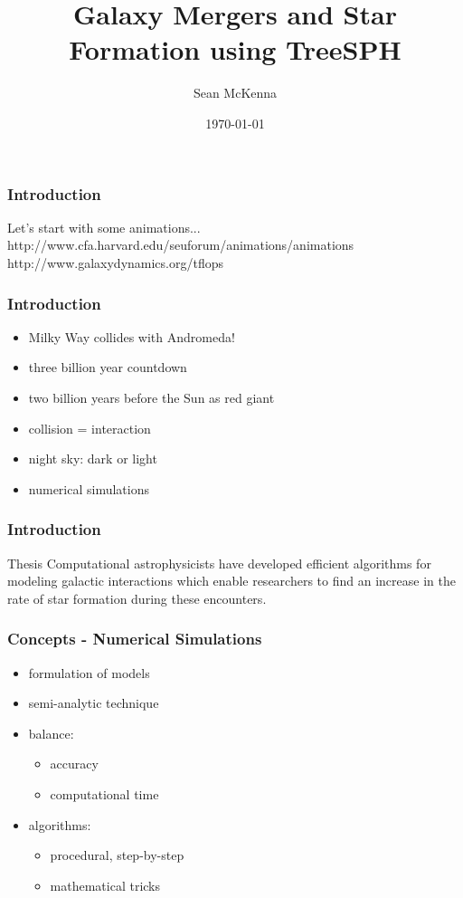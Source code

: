 \documentclass{beamer}
\title{Galaxy Mergers and Star Formation using TreeSPH}
\author{Sean McKenna}
\institute[Cornell College]
{ Cornell College \\
\medskip
{\emph{smckenna12@cornellcollege.edu}}
}
\date{\today}
\begin{document}
%
\begin{frame}
\titlepage
\end{frame}

\begin{frame}
  \frametitle{Introduction}
  Let's start with some animations...
  \\ http://www.cfa.harvard.edu/seuforum/animations/animations
  \\ http://www.galaxydynamics.org/tflops
\end{frame}

\begin{frame}
  \frametitle{Introduction}
  \begin{itemize}
    \item Milky Way collides with Andromeda!
    \item three billion year countdown
    \item two billion years before the Sun as red giant
    \item collision = interaction
    \item night sky: dark or light
    \item numerical simulations
  \end{itemize}
\end{frame}

\begin{frame}
  \frametitle{Introduction}
  \begin{block}{Thesis}
    Computational astrophysicists have developed efficient algorithms for modeling galactic interactions which enable researchers to find an increase in the rate of star formation during these encounters.
  \end{block}
\end{frame}

\begin{frame}
  \frametitle{Concepts - Numerical Simulations}
  \begin{itemize}
    \item formulation of models
    \item semi-analytic technique
    \item balance:
    \begin{itemize}
      \item accuracy
      \item computational time
    \end{itemize}
    \item algorithms:
    \begin{itemize}
      \item procedural, step-by-step
      \item mathematical tricks
    \end{itemize}
  \end{itemize}
\end{frame}
\end{document}
